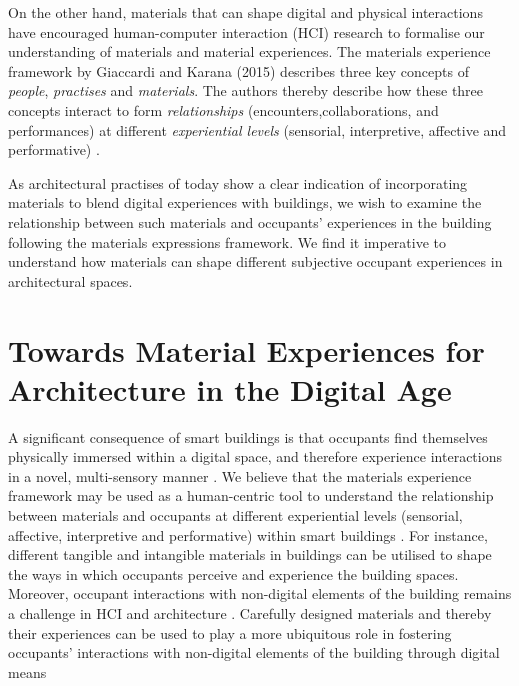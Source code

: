 \documentclass[manuscript, anonymous, review]{acmart}
\begin{document}
On the other hand, materials that can shape digital and physical interactions have encouraged human-computer interaction (HCI) research to formalise our understanding of materials and material experiences. The materials experience framework by Giaccardi and Karana (2015) describes three key concepts of \textit{people}, \textit{practises} and \textit{materials}. The authors thereby describe how these three concepts interact to form \textit{relationships}  (encounters,collaborations, and performances) at different \textit{experiential levels} (sensorial, interpretive, affective and performative) \cite{giaccardi2015foundations}. 

As architectural practises of today show a clear indication of incorporating materials to blend digital experiences with buildings, we wish to examine the relationship between such materials and occupants' experiences in the building following the materials expressions framework. We find it imperative to understand how materials can shape different subjective occupant experiences in architectural spaces.





\section{Towards Material Experiences for Architecture in the Digital Age}
A significant consequence of smart buildings is that occupants find themselves physically immersed within a digital space, and therefore experience interactions in a novel, multi-sensory manner \cite{nembrini2017human}. We believe that the materials experience framework may be used as a human-centric tool to understand the relationship between materials and occupants at different experiential levels (sensorial, affective, interpretive and performative) within smart buildings \cite{giaccardi2015foundations}. For instance, different tangible and intangible materials in buildings can be utilised to shape the ways in which occupants perceive and experience the building spaces. Moreover, occupant interactions with non-digital elements of the building remains a challenge in HCI and architecture \cite{nembrini2017human}. Carefully designed materials and thereby their experiences can be used to play a more ubiquitous role in fostering occupants' interactions with non-digital elements of the building through digital means
 
\end{document}
